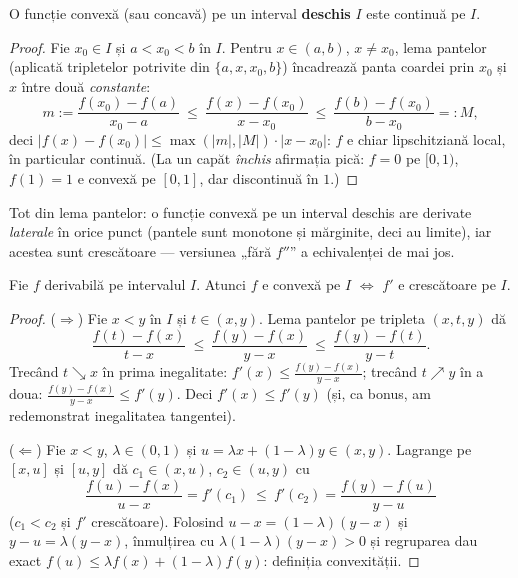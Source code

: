 \begin{teorema}
O funcție convexă (sau concavă) pe un interval \textbf{deschis} $I$ este continuă pe $I$.
\end{teorema}
\begin{proof}
Fie $x_0\in I$ și $a<x_0<b$ în $I$. Pentru $x\in(a,b)$, $x\ne x_0$, lema pantelor (aplicată tripletelor potrivite din $\{a,x,x_0,b\}$) încadrează panta coardei prin $x_0$ și $x$ între două \emph{constante}:
\[
m:=\frac{f(x_0)-f(a)}{x_0-a}\ \le\ \frac{f(x)-f(x_0)}{x-x_0}\ \le\ \frac{f(b)-f(x_0)}{b-x_0}=:M,
\]
deci $|f(x)-f(x_0)|\le\max(|m|,|M|)\cdot|x-x_0|$: $f$ e chiar lipschitziană local, în particular continuă. (La un capăt \emph{închis} afirmația pică: $f=0$ pe $[0,1)$, $f(1)=1$ e convexă pe $[0,1]$, dar discontinuă în $1$.)
\end{proof}

\begin{obs}
Tot din lema pantelor: o funcție convexă pe un interval deschis are derivate \emph{laterale} în orice punct (pantele sunt monotone și mărginite, deci au limite), iar acestea sunt crescătoare --- versiunea „fără $f''$'' a echivalenței de mai jos.
\end{obs}

\begin{teorema}
Fie $f$ derivabilă pe intervalul $I$. Atunci $f$ e convexă pe $I$ $\iff$ $f'$ e crescătoare pe $I$.
\end{teorema}
\begin{proof}
($\Rightarrow$) Fie $x<y$ în $I$ și $t\in(x,y)$. Lema pantelor pe tripleta $(x,t,y)$ dă
\[
\frac{f(t)-f(x)}{t-x}\ \le\ \frac{f(y)-f(x)}{y-x}\ \le\ \frac{f(y)-f(t)}{y-t}.
\]
Trecând $t\searrow x$ în prima inegalitate: $f'(x)\le\frac{f(y)-f(x)}{y-x}$; trecând $t\nearrow y$ în a doua: $\frac{f(y)-f(x)}{y-x}\le f'(y)$. Deci $f'(x)\le f'(y)$ (și, ca bonus, am redemonstrat inegalitatea tangentei).

($\Leftarrow$) Fie $x<y$, $\lambda\in(0,1)$ și $u=\lambda x+(1-\lambda)y\in(x,y)$. Lagrange pe $[x,u]$ și $[u,y]$ dă $c_1\in(x,u)$, $c_2\in(u,y)$ cu
\[
\frac{f(u)-f(x)}{u-x}=f'(c_1)\ \le\ f'(c_2)=\frac{f(y)-f(u)}{y-u}
\]
($c_1<c_2$ și $f'$ crescătoare). Folosind $u-x=(1-\lambda)(y-x)$ și $y-u=\lambda(y-x)$, înmulțirea cu $\lambda(1-\lambda)(y-x)>0$ și regruparea dau exact $f(u)\le\lambda f(x)+(1-\lambda)f(y)$: definiția convexității.
\end{proof}

